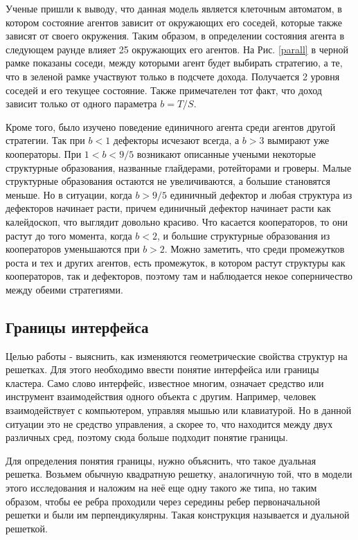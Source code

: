 \documentclass[12pt,a4paper]{article}
\begin{document}
	
	
	
	\par Ученые пришли к выводу, что данная модель является клеточным автоматом, в котором состояние агентов зависит от окружающих его соседей, которые также зависят от своего окружения. Таким образом, в определении состояния агента в следующем раунде влияет 25 окружающих его агентов. На Рис. \ref{parall} в черной рамке показаны соседи, между которыми агент будет выбирать стратегию, а те, что в зеленой рамке участвуют только в подсчете дохода. Получается 2 уровня соседей и его текущее состояние. Также примечателен тот факт, что доход зависит только от одного параметра $b=T/S$. 
	
	\par Кроме того, было изучено поведение единичного агента среди агентов другой стратегии. Так при $b<1$ дефекторы исчезают всегда, а $b>3$ вымирают уже кооператоры. При $1<b<9/5$ возникают описанные учеными некоторые структурные образования, названные глайдерами, ротейторами и гроверы. Малые структурные образования остаются не увеличиваются, а большие становятся меньше. Но в ситуации, когда $b>9/5$ единичный дефектор и любая структура из дефекторов начинает расти, причем единичный дефектор начинает расти как калейдоскоп, что выглядит довольно красиво. Что касается кооператоров, то они растут до того момента, когда $b<2$, и большие структурные образования из кооператоров уменьшаются при $b>2$. Можно заметить, что среди промежутков роста и тех и других агентов, есть промежуток, в котором растут структуры как кооператоров, так и дефекторов, поэтому там и наблюдается некое соперничество между обеими стратегиями.
	
	\subsection{Границы интерфейса}
	
	\par Целью работы - выяснить, как изменяются геометрические свойства структур на решетках. Для этого необходимо ввести понятие интерфейса или границы кластера. Само слово интерфейс, известное многим, означает средство или инструмент взаимодействия одного объекта с другим. Например, человек взаимодействует с компьютером, управляя мышью или клавиатурой. Но в данной ситуации это не средство управления, а скорее то, что находится между двух различных сред, поэтому сюда больше подходит понятие границы.
	
	\par Для определения понятия границы, нужно объяснить, что такое дуальная решетка. Возьмем обычную квадратную решетку, аналогичную той, что в модели этого исследования и наложим на неё еще одну такого же типа, но таким образом, чтобы ее ребра проходили через середины ребер первоначальной решетки и были им перпендикулярны. Такая конструкция называется и дуальной решеткой.
	
\end{document}
